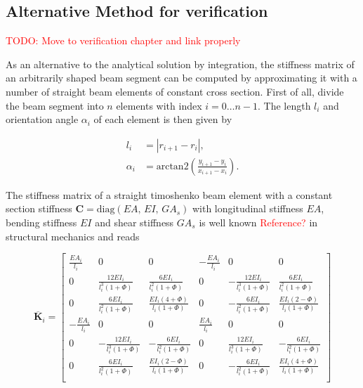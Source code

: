 \newpage
\subsection*{Alternative Method for verification}

\textcolor{red}{TODO: Move to verification chapter and link properly}

As an alternative to the analytical solution by integration, the stiffness matrix of an arbitrarily shaped beam segment can be computed by approximating it with a number of straight beam elements of constant cross section.
First of all, divide the beam segment into $n$ elements with index $i = 0 \ldots n-1$.
The length $l_i$ and orientation angle $\alpha_i$ of each element is then given by

\begin{align}
l_{i} &= \left| r_{i+1} - r_{i} \right|, \\
\alpha_i &= \mathrm{arctan2}\left(\frac{y_{i+1} - y_{i}}{x_{i+1} - x_{i}}\right).
\end{align}

The stiffness matrix of a straight timoshenko beam element with a constant section stiffness $\boldsymbol{C} = \mathrm{diag}(EA,\,EI,\,GA_s)$ with longitudinal stiffness $EA$, bending stiffness $EI$ and shear stiffness $GA_s$ is well known \textcolor{red}{Reference?} in structural mechanics and reads

\begin{equation}
\renewcommand\arraystretch{1.5}
\overline{\boldsymbol{K}}_i = \begin{bmatrix}
 \frac{EA_i}{l_i} &                           0 &                                0 & -\frac{EA_i}{l_i} &                           0 &                                0 \\
            0 &  \frac{12EI_i}{l_i^3(1 + \Phi)} &        \frac{6EI_i}{l_i^2(1 + \Phi)} &             0 & -\frac{12EI_i}{l_i^3(1 + \Phi)} &        \frac{6EI_i}{l_i^2(1 + \Phi)} \\
            0 &   \frac{6EI_i}{l_i^2(1 + \Phi)} & \frac{EI_i(4 + \Phi)}{l_i(1 + \Phi)} &             0 &  -\frac{6EI_i}{l_i^2(1 + \Phi)} & \frac{EI_i(2 - \Phi)}{l_i(1 + \Phi)} \\
-\frac{EA_i}{l_i} &                           0 &                                0 &  \frac{EA_i}{l_i} &                           0 &                                0 \\
            0 & -\frac{12EI_i}{l_i^3(1 + \Phi)} &       -\frac{6EI_i}{l_i^2(1 + \Phi)} &             0 &  \frac{12EI_i}{l_i^3(1 + \Phi)} &       -\frac{6EI_i}{l_i^2(1 + \Phi)} \\
            0 &   \frac{6EI_i}{l_i^2(1 + \Phi)} & \frac{EI_i(2 - \Phi)}{l_i(1 + \Phi)} &             0 &  -\frac{6EI_i}{l_i^2(1 + \Phi)} & \frac{EI_i(4 + \Phi)}{l_i(1 + \Phi)} \\
\end{bmatrix}
\end{equation}

